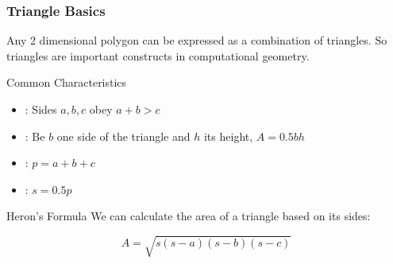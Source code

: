 \begin{frame}
  \frametitle{Triangle Basics}
  {\smaller
    Any 2 dimensional polygon can be expressed as a combination of
    triangles. So triangles are important constructs in computational
    geometry.

    \begin{block}{Common Characteristics}
      \begin{itemize}
      \item {}: Sides $a,b,c$ obey $a+b > c$
      \item {}: Be $b$ one side of the triangle
        and $h$ its height, $A=0.5bh$
      \item {}: $p=a+b+c$
      \item {}: $s = 0.5p$
      \end{itemize}
    \end{block}

    \begin{block}{Heron's Formula}
      We can calculate the area of a triangle based on its sides:

      \begin{equation*}
        A = \sqrt{s(s-a)(s-b)(s-c)}
      \end{equation*}
    \end{block}


  }
\end{frame}

